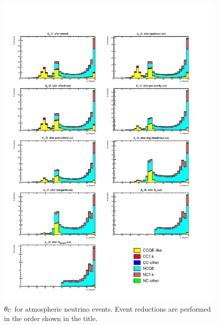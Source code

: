 \begin{figure}[h]
	\centering
	\includegraphics[width=15cm]{PDF/Dist_ATM/Che_50deg_tag_ge1/All/angle}
	\caption[$\theta_{\rm C}$ for atmospheric neutrino events]{
	$\theta_{\rm C}$ for atmospheric neutrino events.
	Event reductions are performed in the order shown in the title.
	}\label{ATM_angle}
\end{figure}

